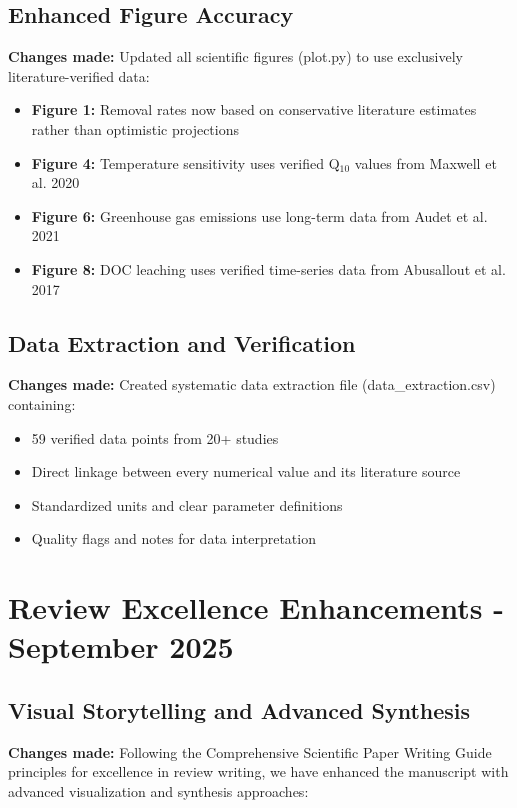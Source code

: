 \documentclass[12pt,a4paper]{article}
\begin{document}
\subsection{Enhanced Figure Accuracy}
\textbf{Changes made:} Updated all scientific figures (plot.py) to use exclusively literature-verified data:
\begin{itemize}
\item \textbf{Figure 1:} Removal rates now based on conservative literature estimates rather than optimistic projections
\item \textbf{Figure 4:} Temperature sensitivity uses verified Q$_{10}$ values from Maxwell et al. 2020
\item \textbf{Figure 6:} Greenhouse gas emissions use long-term data from Audet et al. 2021
\item \textbf{Figure 8:} DOC leaching uses verified time-series data from Abusallout et al. 2017
\end{itemize}

\subsection{Data Extraction and Verification}
\textbf{Changes made:} Created systematic data extraction file (data\_extraction.csv) containing:
\begin{itemize}
\item 59 verified data points from 20+ studies
\item Direct linkage between every numerical value and its literature source
\item Standardized units and clear parameter definitions
\item Quality flags and notes for data interpretation
\end{itemize}

\section{Review Excellence Enhancements - September 2025}

\subsection{Visual Storytelling and Advanced Synthesis}
\textbf{Changes made:} Following the Comprehensive Scientific Paper Writing Guide principles for excellence in review writing, we have enhanced the manuscript with advanced visualization and synthesis approaches:
\end{document}
